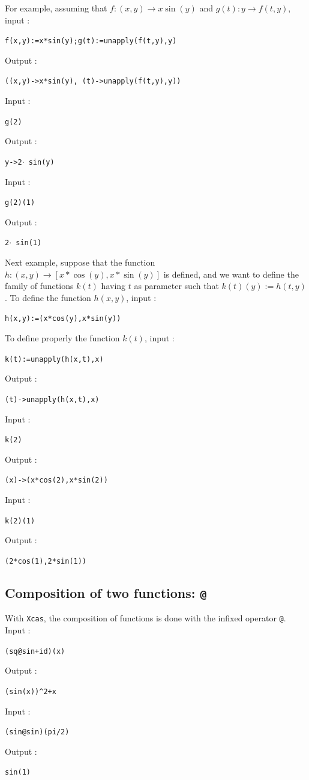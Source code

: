 \documentclass[a4paper,11pt]{book}
\begin{document}
For example, assuming that $f:(x,y)\rightarrow x\sin(y)$ and $g(t): y\rightarrow f(t,y)$, input :
\begin{center}{\tt f(x,y):=x*sin(y);g(t):=unapply(f(t,y),y)}\end{center}
Output :
\begin{center}{\tt ((x,y)->x*sin(y), (t)->unapply(f(t,y),y))}\end{center}
Input :
\begin{center}{\tt g(2)}\end{center}
Output :
\begin{center}{\tt   y->2$\cdot$ sin(y)}\end{center}
Input :
\begin{center}{\tt g(2)(1)}\end{center}
Output :
\begin{center}{\tt   2$\cdot$ sin(1)}\end{center}

Next example, suppose that the function 
$h: (x,y) \rightarrow  [x*\cos(y),x*\sin(y)]$ is defined, and 
we want to define the family of  functions $k(t)$ having $t$ as
parameter such that $k(t)(y):=h(t,y)$.
To define the function $h(x,y)$, input :
\begin{center}{\tt h(x,y):=(x*cos(y),x*sin(y))}\end{center}
To define properly the function  $k(t)$, input :
\begin{center}{\tt k(t):=unapply(h(x,t),x)}\end{center}
Output :
\begin{center}{\tt (t)->unapply(h(x,t),x)}\end{center}
Input :
\begin{center}{\tt k(2)}\end{center}
Output :
\begin{center}{\tt (x)->(x*cos(2),x*sin(2))}\end{center}
Input :
\begin{center}{\tt k(2)(1)}\end{center}
Output :
\begin{center}{\tt   (2*cos(1),2*sin(1))}\end{center}

\subsection{Composition of two functions: {\tt @}}
With {\tt Xcas}, the composition of functions is done with the infixed operator
{\tt @}.\\
Input :
\begin{center}{\tt (sq@sin+id)(x)}\end{center}
Output :
\begin{center}{\tt (sin(x))\verb|^|2+x}\end{center}  
Input :
\begin{center}{\tt (sin@sin)(pi/2)}\end{center}
Output :
\begin{center}{\tt sin(1)}\end{center}  
\end{document}
